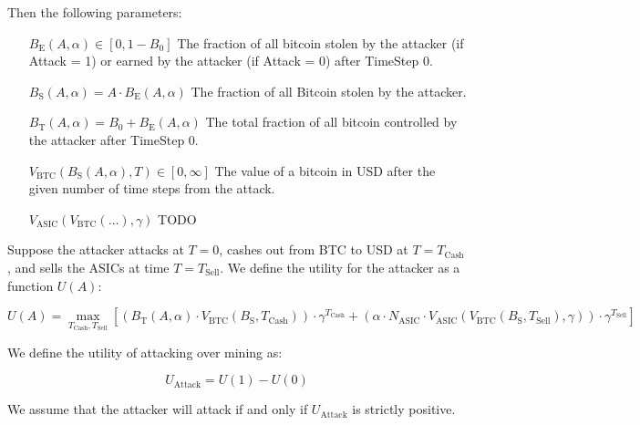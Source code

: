 \documentclass[12pt]{article}
\newcommand*{\Attack}{A}
\newcommand*{\Time}{T}
\newcommand*{\ABtcOrig}{{B_0}}
\newcommand*{\NumAsics}{{N_{\mathrm{ASIC}}}}
\newcommand*{\ABtcEarned}{{B_{\mathrm{E}}}}
\newcommand*{\ABtcStolen}{{B_{\mathrm{S}}}}
\newcommand*{\ABtcTotal}{{B_{\mathrm{T}}}}
\newcommand*{\ExchgRate}{{V_{\mathrm{BTC}}}}
\newcommand*{\AsicValue}{{V_{\mathrm{ASIC}}}}
\newcommand*{\TimeCashOut}{{T_{\mathrm{Cash}}}}
\newcommand*{\TimeSellAsics}{{T_{\mathrm{Sell}}}}
\newcommand*{\Utility}{U}
\newcommand*{\AttackUtility}{{U_{\mathrm{Attack}}}}
\begin{document}
Then the following parameters:

\begin{enumerate}[labelindent=0pt,labelwidth=2in,itemindent=0em,align=parleft,leftmargin=!]
	\item[{$\ABtcEarned(\Attack, \alpha) \in [0, 1 - B_0]$}]
		The fraction of all bitcoin stolen by the attacker (if Attack = 1) or
		earned by the attacker (if Attack = 0) after TimeStep 0.
	\item[{$\ABtcStolen(\Attack, \alpha) = \Attack \cdot \ABtcEarned(\Attack, \alpha)$}]
		The fraction of all Bitcoin stolen by the attacker.
	\item[{$\ABtcTotal(\Attack, \alpha) = \ABtcOrig + \ABtcEarned(\Attack, \alpha)$}]
		The total fraction of all bitcoin controlled by the attacker after TimeStep
		0.
	\item[{$\ExchgRate(\ABtcStolen(\Attack, \alpha), \Time) \in [0, \infty]$}]
		The value of a bitcoin in USD after the given number of time steps from the
		attack.
	\item[{$\AsicValue(\ExchgRate(\ldots), \gamma)$}]
		TODO
\end{enumerate}

Suppose the attacker attacks at $\Time = 0$, cashes out from BTC to USD at
$\Time = \TimeCashOut$, and sells the ASICs at time $\Time = \TimeSellAsics$.
We define the utility for the attacker as a function $\Utility(\Attack)$:

\[
	\Utility(\Attack) =
	\max_{\TimeCashOut, \TimeSellAsics}
		\left[
			(\ABtcTotal(\Attack, \alpha) \cdot \ExchgRate(\ABtcStolen, \TimeCashOut))
				\cdot \gamma^\TimeCashOut
			+
			(\alpha \cdot \NumAsics \cdot \AsicValue(\ExchgRate(\ABtcStolen, \TimeSellAsics), \gamma))
				\cdot \gamma^\TimeSellAsics
		\right]
\]

We define the utility of attacking over mining as:

\[
	\AttackUtility = \Utility(1) - \Utility(0)
\]

We assume that the attacker will attack if and only if $\AttackUtility$ is
strictly positive.
\end{document}
